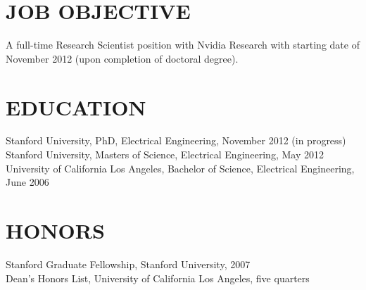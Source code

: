 \documentclass{res}
\begin{document}
 

\address{\texttt{jesselu@stanford.edu} \\ 66 Newell Rd. Apt. O \\ East Palo Alto, CA \\ (408) 568-9356}
                                  
\begin{resume}

\section{JOB OBJECTIVE}          
    A full-time Research Scientist position with Nvidia Research with starting date of November 2012 
    (upon completion of doctoral degree).

\section{EDUCATION}          
    Stanford University, PhD, Electrical Engineering, November 2012 (in progress) \\
    Stanford University, Masters of Science, Electrical Engineering, May 2012 \\
    University of California Los Angeles, Bachelor of Science, Electrical Engineering, June 2006

\section{HONORS}
    Stanford Graduate Fellowship, Stanford University, 2007 \\
    Dean's Honors List, University of California Los Angeles, five quarters
 

\end{resume}
\end{document}

